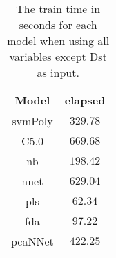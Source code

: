 \begin{table}[!ht]
	\centering
	\begin{tabular}{|c|c|}
		\hline
		Model & elapsed \\ \hline
		svmPoly & $329.78$ \\ \hline
		C5.0 & $669.68$ \\ \hline
		nb & $198.42$ \\ \hline
		nnet & $629.04$ \\ \hline
		pls & $62.34$ \\ \hline
		fda & $97.22$ \\ \hline
		pcaNNet & $422.25$ \\ \hline
	\end{tabular}
	\caption{The train time in seconds for each model when using all variables except Dst as input.}
	\label{tab:time:noDst:train}
\end{table}
